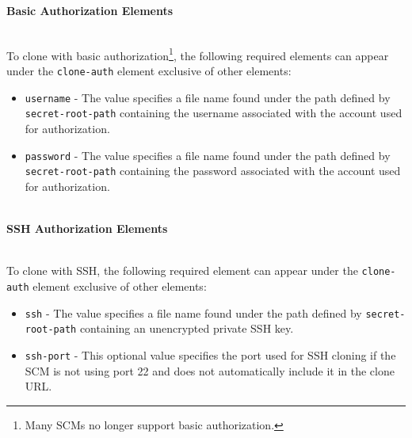 \noindent\\\textbf{Basic Authorization Elements}

\noindent\\To clone with basic authorization\footnote{Many SCMs no longer support basic authorization.}, the following required elements can appear under the
\texttt{clone-auth} element exclusive of other elements:

\begin{itemize}
    \item \texttt{username} - The value specifies a file name found under the path defined
    by \texttt{secret-root-path} containing the username associated with the account used
    for authorization. 
    \item \texttt{password} - The value specifies a file name found under the path defined
    by \texttt{secret-root-path} containing the password associated with the account used
    for authorization. 
\end{itemize}

\noindent\\\textbf{SSH Authorization Elements}

\noindent\\To clone with SSH, the following required element can appear under the
\texttt{clone-auth} element exclusive of other elements:

\begin{itemize}
    \item \texttt{ssh} - The value specifies a file name found under the path defined
    by \texttt{secret-root-path} containing an unencrypted private SSH key.
    \item \texttt{ssh-port} - This optional value specifies the port used for SSH cloning
    if the SCM is not using port 22 and does not automatically include it in the clone
    URL.
\end{itemize}





